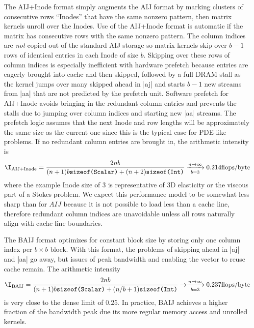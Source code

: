 The AIJ+Inode format simply augments the AIJ format by marking clusters of consecutive rows ``Inodes'' that have the same nonzero pattern, then matrix kernels unroll over the Inodes.
Use of the AIJ+Inode format is automatic if the matrix has consecutive rows with the same nonzero pattern.
The column indices are \emph{not} copied out of the standard AIJ storage so matrix kernels skip over $b-1$ rows of identical entries in each Inode of size $b$.
Skipping over these rows of column indices is especially inefficient with hardware prefetch because entries are eagerly brought into cache and then skipped, followed by a full DRAM stall as the kernel jumps over many skipped ahead in \cverb|aj| and starts $b-1$ new streams from \cverb|aa| that are not predicted by the prefetch unit.
Software prefetch for AIJ+Inode avoids bringing in the redundant column entries and prevents the stalls due to jumping over column indices and starting new \cverb|aa| streams.
The prefetch logic assumes that the next Inode and row lengths will be approximately the same size as the current one since this is the typical case for PDE-like problems.
If no redundant column entries are brought in, the arithmetic intensity is
\begin{align*}
  \I_{\text{AIJ+Inode}} = \frac{2nb}{(n+1)b\texttt{sizeof(Scalar)} + (n+2)\texttt{sizeof(Int)}} \xrightarrow[b=3]{n\to\infty} 0.214 \text{flops/byte}
\end{align*}
where the example Inode size of 3 is representative of 3D elasticity or the viscous part of a Stokes problem.
We expect this performance model to be somewhat less sharp than for $AIJ$ because it is not possible to load less than a cache line, therefore redundant column indices are unavoidable unless all rows naturally align with cache line boundaries.

The BAIJ format optimizes for constant block size by storing only one column index per $b\times b$ block.
With this format, the problems of skipping ahead in \cverb|aj| and \cverb|aa| go away, but issues of peak bandwidth and enabling the vector to reuse cache remain.
The arithmetic intensity
\begin{align*}
  \I_{\text{BAIJ}} = \frac{2nb}{(n+1)b\texttt{sizeof(Scalar)} + (n/b+1)\texttt{sizeof(Int)}} \to \xrightarrow[b=3]{n\to\infty} 0.237 \text{flops/byte}
\end{align*}
is very close to the dense limit of $0.25$.
In practice, BAIJ achieves a higher fraction of the bandwidth peak due its more regular memory access and unrolled kernels.

